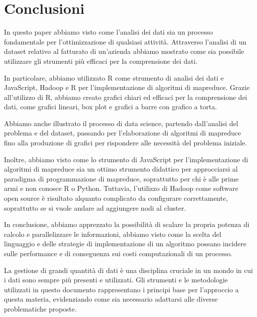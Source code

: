 \section{Conclusioni}
In questo paper abbiamo visto come l'analisi dei dati sia un processo fondamentale per l'ottimizzazione di qualsiasi attività. Attraverso l'analisi di un dataset relativo al fatturato di un'azienda abbiamo mostrato come sia possibile utilizzare gli strumenti più efficaci per la comprensione dei dati.

In particolare, abbiamo utilizzato R come strumento di analisi dei dati e JavaScript, Hadoop e R per l'implementazione di algoritmi di mapreduce. Grazie all'utilizzo di R, abbiamo creato grafici chiari ed efficaci per la comprensione dei dati, come grafici lineari, box plot e grafici a barre con grafico a torta.

Abbiamo anche illustrato il processo di data science, partendo dall'analisi del problema e del dataset, passando per l'elaborazione di algoritmi di mapreduce fino alla produzione di grafici per rispondere alle necessità del problema iniziale.

Inoltre, abbiamo visto come lo strumento di JavaScript per l'implementazione di algoritmi di mapreduce sia un ottimo strumento didattico per approcciarsi al paradigma di programmazione di mapreduce, soprattutto per chi è alle prime armi e non conosce R o Python. Tuttavia, l'utilizzo di Hadoop come software open source è risultato alquanto complicato da configurare correttamente, soprattutto se si vuole andare ad aggiungere nodi al cluster.

In conclusione, abbiamo apprezzato la possibilità di scalare la propria potenza di calcolo e parallelizzare le informazioni, abbiamo visto come la scelta del linguaggio e delle strategie di implementazione di un algoritmo possano incidere sulle performance e di conseguenza sui costi computazionali di un processo.

La gestione di grandi quantità di dati è una disciplina cruciale in un mondo in cui i dati sono sempre più presenti e utilizzati. Gli strumenti e le metodologie utilizzati in questo documento rappresentano i principi base per l'approccio a questa materia, evidenziando come sia necessario adattarsi alle diverse problematiche proposte.